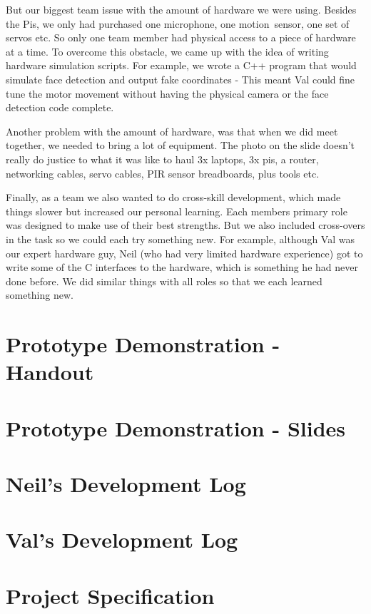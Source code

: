 \documentclass[11pt,a4paper,titlepage]{report}
\begin{document}
\begin{appendices}
But our biggest team issue with the amount of hardware we were using. Besides the Pis, we only had purchased one microphone, one motion sensor, one set of servos etc. So only one team member had physical access to a piece of hardware at a time. To overcome this obstacle, we came up with the idea of writing hardware simulation scripts. For example, we wrote a C++ program that would simulate face detection and output fake coordinates - This meant Val could fine tune the motor movement without having the physical camera or the face detection code complete.

Another problem with the amount of hardware, was that when we did meet together, we needed to bring a lot of equipment. The photo on the slide doesn’t really do justice to what it was like to haul 3x laptops, 3x pis, a router, networking cables, servo cables, PIR sensor breadboards, plus tools etc.

Finally, as a team we also wanted to do cross-skill development, which made things slower but increased our personal learning. Each members primary role was designed to make use of their best strengths. But we also included cross-overs in the task so we could each try something new. For example, although Val was our expert hardware guy, Neil (who had very limited hardware experience) got to write some of the C interfaces to the hardware, which is something he had never done before. We did similar things with all roles so that we each learned something new.

\chapter{Prototype Demonstration - Handout}




\chapter{Prototype Demonstration - Slides}



\chapter{Neil's Development Log}


\chapter{Val's Development Log}


\chapter{Project Specification}




\end{appendices}

\nocite{*}
\printbibliography[heading=bibintoc]
\end{document}
